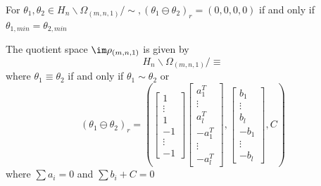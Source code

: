\documentclass[11pt,letterpaper]{amsart}
\begin{document}
\begin{corollary}\label{cor:ominusred0cor}
    For $\theta_1, \theta_2\in H_n\backslash\Omega_{(m,n,1)}/\sim, (\theta_1\ominus \theta_2)_r = (0, 0, 0, 0)$ if and only if $\theta_{1, min}=\theta_{2, min}$ 
\end{corollary}
\begin{theorem}\label{thm:symmetryclassificationk=1}
    The quotient space $\im\rho_{(m, n,1)}$ is given by
    $$
    H_n\backslash\Omega_{(m,n,1)}/\equiv
    $$
    where $\theta_1\equiv\theta_2$ if and only if $\theta_1\sim\theta_2$ or 
    $$
    (\theta_1\ominus\theta_2)_r = \left(\begin{bmatrix}
        1\\
        \vdots\\
        1\\
        -1\\
        \vdots\\
        -1
    \end{bmatrix}
    \begin{bmatrix}
        a_1^T\\
        \vdots\\
        a_l^T\\
        -a_{1}^T\\
        \vdots\\
        -a_{l}^T
    \end{bmatrix}, \begin{bmatrix}
        b_1\\
        \vdots\\
        b_l\\
        -b_1\\
        \vdots\\
        -b_l
    \end{bmatrix}, C
    \right)
    $$
    where $\sum a_i = 0$ and $\sum b_i + C = 0$
\end{theorem}
\end{document}
